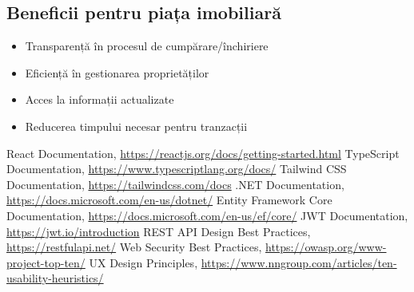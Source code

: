 \documentclass[12pt,a4paper]{report}
\begin{document}
\subsection{Beneficii pentru piața imobiliară}
\begin{itemize}
    \item Transparență în procesul de cumpărare/închiriere
    \item Eficiență în gestionarea proprietăților
    \item Acces la informații actualizate
    \item Reducerea timpului necesar pentru tranzacții
\end{itemize}

\begin{thebibliography}{9}
 React Documentation, \url{https://reactjs.org/docs/getting-started.html}
 TypeScript Documentation, \url{https://www.typescriptlang.org/docs/}
 Tailwind CSS Documentation, \url{https://tailwindcss.com/docs}
 .NET Documentation, \url{https://docs.microsoft.com/en-us/dotnet/}
 Entity Framework Core Documentation, \url{https://docs.microsoft.com/en-us/ef/core/}
 JWT Documentation, \url{https://jwt.io/introduction}
 REST API Design Best Practices, \url{https://restfulapi.net/}
 Web Security Best Practices, \url{https://owasp.org/www-project-top-ten/}
 UX Design Principles, \url{https://www.nngroup.com/articles/ten-usability-heuristics/}
\end{thebibliography}
\end{document}
